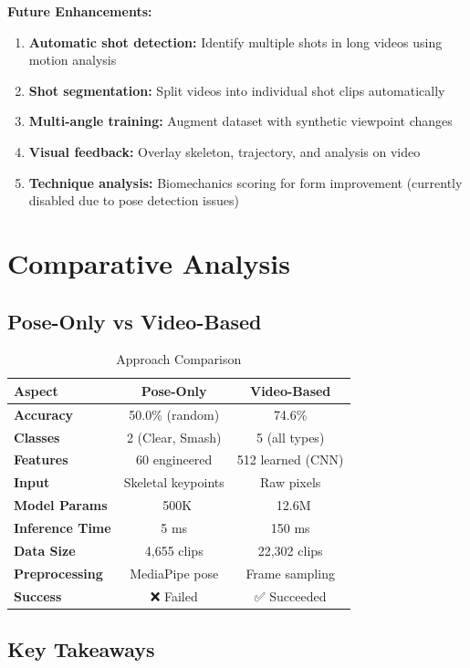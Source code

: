 \documentclass[12pt,a4paper]{article}
\begin{document}
\textbf{Future Enhancements:}
\begin{enumerate}
\item \textbf{Automatic shot detection:} Identify multiple shots in long videos using motion analysis
\item \textbf{Shot segmentation:} Split videos into individual shot clips automatically
\item \textbf{Multi-angle training:} Augment dataset with synthetic viewpoint changes
\item \textbf{Visual feedback:} Overlay skeleton, trajectory, and analysis on video
\item \textbf{Technique analysis:} Biomechanics scoring for form improvement (currently disabled due to pose detection issues)
\end{enumerate}

\section{Comparative Analysis}

\subsection{Pose-Only vs Video-Based}

\begin{table}[H]
\centering
\caption{Approach Comparison}
\begin{tabular}{lcc}
\toprule
Aspect & Pose-Only & Video-Based \\
\midrule
\textbf{Accuracy} & 50.0\% (random) & 74.6\% \\
\textbf{Classes} & 2 (Clear, Smash) & 5 (all types) \\
\textbf{Features} & 60 engineered & 512 learned (CNN) \\
\textbf{Input} & Skeletal keypoints & Raw pixels \\
\textbf{Model Params} & ~500K & ~12.6M \\
\textbf{Inference Time} & 5 ms & 150 ms \\
\textbf{Data Size} & 4,655 clips & 22,302 clips \\
\textbf{Preprocessing} & MediaPipe pose & Frame sampling \\
\textbf{Success} & ❌ Failed & ✅ Succeeded \\
\bottomrule
\end{tabular}
\end{table}

\subsection{Key Takeaways}
\end{document}
